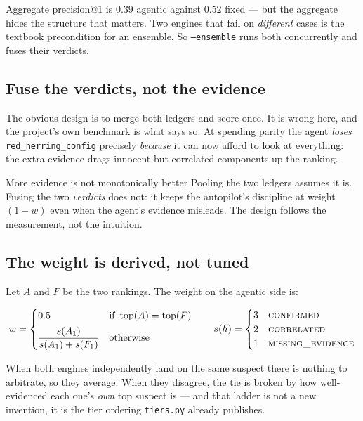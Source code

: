 \documentclass[11pt,a4paper]{article}
\newcommand{\code}[1]{\texttt{\small #1}}
\begin{document}
\noindent
Aggregate precision@1 is $0.39$ agentic against $0.52$ fixed --- but the
aggregate hides the structure that matters. Two engines that fail on
\emph{different} cases is the textbook precondition for an ensemble. So
\code{--ensemble} runs both concurrently and fuses their verdicts.

\subsection{Fuse the verdicts, not the evidence}

The obvious design is to merge both ledgers and score once. It is wrong here, and
the project's own benchmark is what says so. At spending parity the agent
\emph{loses} \code{red\_herring\_config} precisely \emph{because} it can now
afford to look at everything: the extra evidence drags innocent-but-correlated
components up the ranking.

\begin{keybox}{More evidence is not monotonically better}
Pooling the two ledgers assumes it is. Fusing the two \emph{verdicts} does not:
it keeps the autopilot's discipline at weight $(1-w)$ even when the agent's
evidence misleads. The design follows the measurement, not the intuition.
\end{keybox}

\subsection{The weight is derived, not tuned}

Let $A$ and $F$ be the two rankings. The weight on the agentic side is:

\begin{equation}
w =
\begin{cases}
  0.5 & \text{if } \operatorname{top}(A) = \operatorname{top}(F) \\[0.4em]
  \dfrac{s(A_1)}{s(A_1) + s(F_1)} & \text{otherwise}
\end{cases}
\qquad
s(h) =
\begin{cases}
3 & \text{\textsc{confirmed}} \\
2 & \text{\textsc{correlated}} \\
1 & \text{\textsc{missing\textunderscore evidence}}
\end{cases}
\end{equation}

When both engines independently land on the same suspect there is nothing to
arbitrate, so they average. When they disagree, the tie is broken by how
well-evidenced each one's \emph{own} top suspect is --- and that ladder is not a
new invention, it is the tier ordering \code{tiers.py} already publishes.
\end{document}
